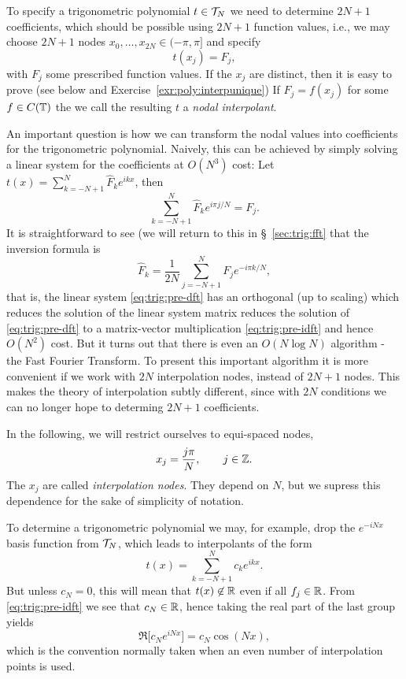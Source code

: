 To specify a trigonometric polynomial $t \in \mathcal{T}_N$ we need to determine
$2N+1$ coefficients, which should be possible using $2N+1$ function values,
i.e., we may choose $2N+1$ nodes $x_0, \dots, x_{2N} \in (-\pi, \pi]$
and specify 
\[
    t(x_j) = F_j,  
\]
with $F_j$ some prescribed function values. If the $x_j$ are distinct, then it
is easy to prove (see below and Exercise~\ref{exr:poly:interpunique}) If $F_j =
f(x_j)$ for some $f \in C(\mathbb{T})$ the we call the resulting $t$ a {\em nodal
interpolant}. 

An important question is how we can transform the nodal values into coefficients
for the trigonometric polynomial. Naively, this can be achieved by simply
solving a linear system for the coefficients at $O(N^3)$ cost: 
Let $t(x) = \sum_{k = -N+1}^N \hat{F}_k e^{ik x}$, then
\begin{equation} \label{eq:trig:pre-dft}
  \sum_{k = -N+1}^N \hat{F}_k e^{i\pi j/N} = F_j.
\end{equation}
It is straightforward to see (we will return to this in \S~\ref{sec:trig:fft}
that the inversion formula is 
\begin{equation} \label{eq:trig:pre-idft}
    \hat{F}_k = \frac{1}{2N} \sum_{j = -N+1}^N F_j e^{-i\pi k/N},
\end{equation}
that is, the linear system \eqref{eq:trig:pre-dft}  has an orthogonal (up to
scaling) which reduces the solution of the linear system matrix reduces the
solution of \eqref{eq:trig:pre-dft} to a matrix-vector multiplication
\eqref{eq:trig:pre-idft} and hence $O(N^2)$ cost. But it turns out that there is
even an $O(N \log N)$ algorithm - the Fast Fourier Transform. To present this
important algorithm it is more convenient if we work with $2N$ interpolation
nodes, instead of $2N+1$ nodes. This makes the theory of interpolation subtly
different, since with $2N$ conditions we can no longer hope to determing $2N+1$
coefficients. 

In the following, we will restrict ourselves to equi-spaced nodes, 
\[
  x_j =  \frac{j \pi}{N},  \qquad j \in \mathbb{Z}.
\]
The $x_j$ are called {\em interpolation nodes}. They depend on $N$, but we
supress this dependence for the sake of simplicity of notation.

To determine a trigonometric polynomial we may, for example, 
drop the $e^{-iNx}$ basis function from $\mathcal{T}_N$, which leads to 
interpolants of the form 
\[
    t(x) = \sum_{k = -N+1}^N c_k e^{ik x}.
\]
But unless $c_N = 0$, this will mean that $t(x) \not\in \mathbb{R}$ even if all $f_j \in
\mathbb{R}$. From \eqref{eq:trig:pre-idft} we see that $c_N \in \mathbb{R}$, hence taking 
the real part of the last group yields 
\[
    \Re \big[ c_N e^{i N x} \big]   = c_N \cos(Nx),
\]
which is the convention normally taken when an even number of interpolation 
points is used. 

